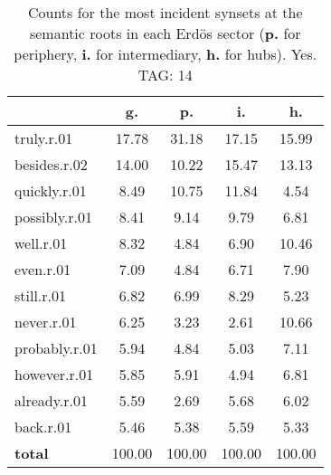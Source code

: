 \begin{table}[h!]
\begin{center}
\begin{tabular}{| l | c | c | c | c |}\hline
 & g. & p. & i. & h. \\\hline
truly.r.01 & 17.78  & 31.18  & 17.15  & 15.99 \\\hline
besides.r.02 & 14.00  & 10.22  & 15.47  & 13.13 \\\hline
quickly.r.01 & 8.49  & 10.75  & 11.84  & 4.54 \\\hline
possibly.r.01 & 8.41  & 9.14  & 9.79  & 6.81 \\\hline
well.r.01 & 8.32  & 4.84  & 6.90  & 10.46 \\\hline
even.r.01 & 7.09  & 4.84  & 6.71  & 7.90 \\\hline
still.r.01 & 6.82  & 6.99  & 8.29  & 5.23 \\\hline
never.r.01 & 6.25  & 3.23  & 2.61  & 10.66 \\\hline
probably.r.01 & 5.94  & 4.84  & 5.03  & 7.11 \\\hline
however.r.01 & 5.85  & 5.91  & 4.94  & 6.81 \\\hline
already.r.01 & 5.59  & 2.69  & 5.68  & 6.02 \\\hline
back.r.01 & 5.46  & 5.38  & 5.59  & 5.33 \\\hline
{{\bf total}} & 100.00  & 100.00  & 100.00  & 100.00 \\\hline
\end{tabular}
\caption{Counts for the most incident synsets at the semantic roots in each Erd\"os sector ({\bf p.} for periphery, {\bf i.} for intermediary, {\bf h.} for hubs). Yes. TAG: 14}
\end{center}
\end{table}